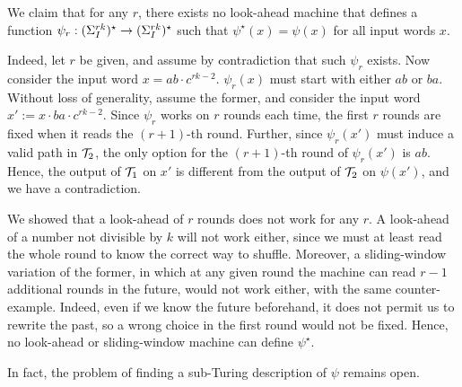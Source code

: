 \begin{example}
We claim that for any $r$, there exists no look-ahead machine that defines a function $\psi_r: (\Sigma_{I}^{rk})^\star \rightarrow (\Sigma_{I}^{rk})^\star$ such that $\psi^\star(x)=\psi(x)$ for all input words $x$.

Indeed, let $r$ be given, and assume by contradiction that such $\psi_r$ exists. Now consider the input word $x=ab\cdot c^{rk-2}$. $\psi_r(x)$ must start with either $ab$ or $ba$. Without loss of generality, assume the former, and consider the input word $x':=x\cdot ba\cdot c^{rk-2}$. Since $\psi_r$ works on $r$ rounds each time, the first $r$ rounds are fixed when it reads the $(r+1)$-th round. Further, since $\psi_r(x')$ must induce a valid path in $\mathcal{T}_2$, the only option for the $(r+1)$-th round of $\psi_r(x')$ is $ab$. Hence, the output of $\mathcal{T}_1$ on $x'$ is different from the output of $\mathcal{T}_2$ on $\psi(x')$, and we have a contradiction.
\end{example}



We showed that a look-ahead of $r$ rounds does not work for any $r$. A look-ahead of a number not divisible by $k$ will not work either, since we must at least read the whole round to know the correct way to shuffle. Moreover, a sliding-window variation of the former, in which at any given round the machine can read $r-1$ additional rounds in the future, would not work either, with the same counter-example. Indeed, even if we know the future beforehand, it does not permit us to rewrite the past, so a wrong choice in the first round would not be fixed. Hence, no look-ahead or sliding-window machine can define $\psi^\star$.

In fact, the problem of finding a sub-Turing description of $\psi$ remains open.

